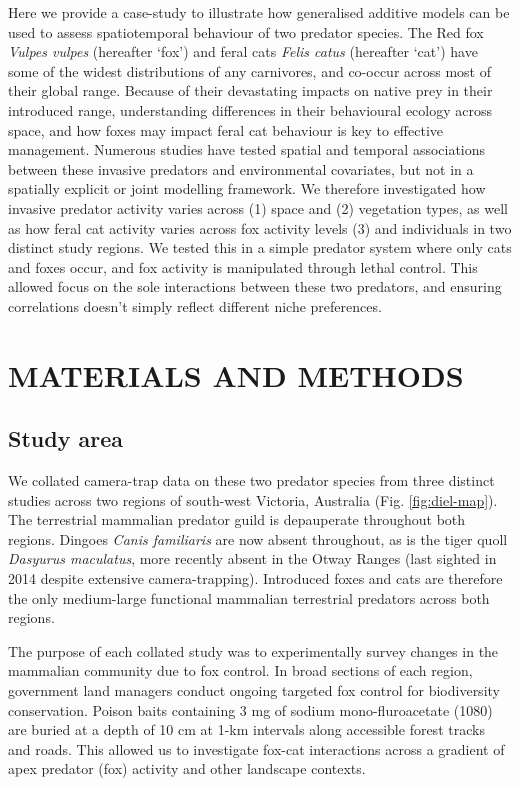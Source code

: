 \documentclass[]{elsarticle} %
\begin{document}
Here we provide a case-study to illustrate how generalised additive models can be used to assess spatiotemporal behaviour of two predator species. The Red fox \emph{Vulpes vulpes} (hereafter `fox') and feral cats \emph{Felis catus} (hereafter `cat') have some of the widest distributions of any carnivores, and co-occur across most of their global range. Because of their devastating impacts on native prey in their introduced range, understanding differences in their behavioural ecology across space, and how foxes may impact feral cat behaviour is key to effective management. Numerous studies have tested spatial and temporal associations between these invasive predators and environmental covariates, but not in a spatially explicit or joint modelling framework. We therefore investigated how invasive predator activity varies across (1) space and (2) vegetation types, as well as how feral cat activity varies across fox activity levels (3) and individuals in two distinct study regions. We tested this in a simple predator system where only cats and foxes occur, and fox activity is manipulated through lethal control. This allowed focus on the sole interactions between these two predators, and ensuring correlations doesn't simply reflect different niche preferences.

\newpage

\hypertarget{materials-and-methods}{%
\section{MATERIALS AND METHODS}\label{materials-and-methods}}

\hypertarget{study-area}{%
\subsection{Study area}\label{study-area}}

We collated camera-trap data on these two predator species from three distinct studies across two regions of south-west Victoria, Australia (Fig. \ref{fig:diel-map}). The terrestrial mammalian predator guild is depauperate throughout both regions. Dingoes \emph{Canis familiaris} are now absent throughout, as is the tiger quoll \emph{Dasyurus maculatus}, more recently absent in the Otway Ranges (last sighted in 2014 despite extensive camera-trapping). Introduced foxes and cats are therefore the only medium-large functional mammalian terrestrial predators across both regions.

The purpose of each collated study was to experimentally survey changes in the mammalian community due to fox control. In broad sections of each region, government land managers conduct ongoing targeted fox control for biodiversity conservation. Poison baits containing 3 mg of sodium mono-fluroacetate (1080) are buried at a depth of 10 cm at 1-km intervals along accessible forest tracks and roads. This allowed us to investigate fox-cat interactions across a gradient of apex predator (fox) activity and other landscape contexts.
\end{document}
